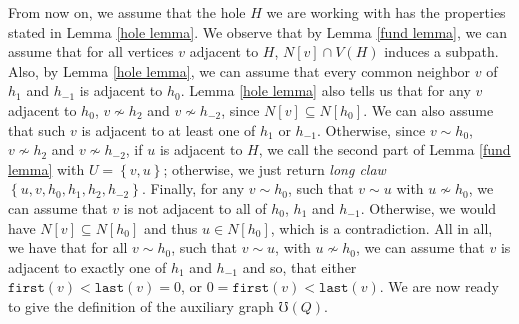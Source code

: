 \documentclass{article}
\begin{document}
    From now on, 
    we assume that the hole $H$
    we are working with
    has the properties
    stated in Lemma \ref{hole lemma}.
    We observe that by
    Lemma \ref{fund lemma},
    we can assume that for
    all vertices 
    $v$ adjacent to $H$, 
    $N\left[v\right] \cap V\left(H\right)$
    induces a subpath.
    Also, by Lemma \ref{hole lemma},
    we can assume that 
    every common neighbor $v$ 
    of $h_1$ and $h_{-1}$ 
    is adjacent to $h_0$.
    Lemma \ref{hole lemma}
    also tells us
    that for any $v$ adjacent
    to $h_0$, $v \not\sim h_2$ 
    and $v \not\sim h_{-2}$,
    since $N\left[v\right] \subseteq N\left[h_0\right]$.
    We can also assume
    that such $v$ is adjacent to at
    least one of $h_1$ or $h_{-1}$.
    Otherwise, since $v \sim h_0$,
    $v \not\sim h_2$ and $v \not \sim h_{-2}$,
    if $u$ is adjacent to $H$,
    we call the second part of 
    Lemma \ref{fund lemma}
    with $U = \left\{v, u\right\}$;
    otherwise, we just
    return \emph{long claw}
    $\left\{u, v, h_0, h_1, h_{2}, h_{-2}\right\}$.
    Finally, for any $v \sim h_0$,
    such that $v \sim u$ with
    $u \not\sim h_0$,
    we can assume that
    $v$ is not 
    adjacent to all
    of $h_0$, $h_1$ and $h_{-1}$. 
    Otherwise, we
    would have $N\left[v\right] \subseteq N\left[h_0\right]$ 
    and thus $u \in N\left[h_0\right]$,
    which is a contradiction.
    All in all, we have
    that for all $v \sim h_0$,
    such that $v \sim u$,
    with $u \not\sim h_0$,
    we can assume that
    $v$ is adjacent to
    exactly one of $h_1$
    and $h_{-1}$ and so,
    that either $\texttt{first}\left(v\right)
    < \texttt{last}\left(v\right) = 0$,
    or $0 = \texttt{first}\left(v\right) < \texttt{last}\left(v\right)$.
    We are now ready to 
    give the definition of 
    the auxiliary graph $\mho\left(Q\right)$.
\end{document}
